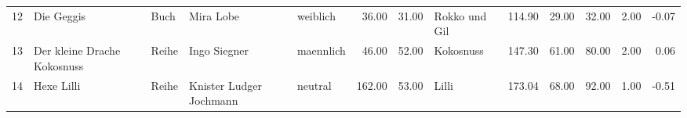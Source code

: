 \begin{sidewaystable}[ht]
\begin{center}
{\begin{tabular}{rllllrrlrrrrr}
  12 & Die Geggis                                                                                                                                                                                                                                                      & Buch & Mira Lobe                                                                                                                                                                                                                                                       & weiblich & 36.00 & 31.00 & Rokko und Gil                                                                                                                                                                                                                                                   & 114.90 & 29.00 & 32.00 & 2.00 & -0.07 \\ 
  13 & Der kleine Drache Kokosnuss                                                                                                                                                                                                                                     & Reihe & Ingo Siegner                                                                                                                                                                                                                                                    & maennlich & 46.00 & 52.00 & Kokosnuss                                                                                                                                                                                                                                                       & 147.30 & 61.00 & 80.00 & 2.00 & 0.06 \\ 
  14 & Hexe Lilli                                                                                                                                                                                                                                                      & Reihe & Knister Ludger Jochmann                                                                                                                                                                                                                                         & neutral & 162.00 & 53.00 & Lilli                                                                                                                                                                                                                                                           & 173.04 & 68.00 & 92.00 & 1.00 & -0.51 \\ 

\end{tabular}}
\end{center}
\end{sidewaystable}
